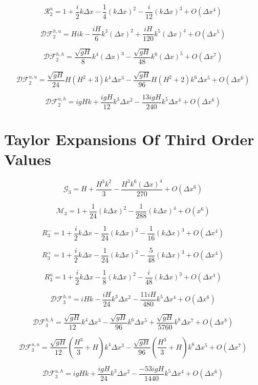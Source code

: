 \documentclass[12pt]{article}
\begin{document}
\[\mathcal{R}^u_2 = 1 + \frac{i}{2}k\Delta x - \frac{1}{4} (k \Delta x)^2 - \frac{i}{12} (k \Delta x)^3 +  O( \Delta x^4)\]

\[\mathcal{D}\mathcal{F}_2^{h,u} = Hik - \frac{iH}{6}k^3(\Delta x)^2 + \frac{iH}{120}k^5 (\Delta x)^4 + O(\Delta x ^5) \]

\[\mathcal{D}\mathcal{F}_2^{h,h} = \frac{\sqrt{gH}}{8} k^4(\Delta x)^3  - \frac{\sqrt{gH}}{48} k^6(\Delta x)^5 + O(\Delta x^7) \]

\[\mathcal{D}\mathcal{F}_2^{u,u} =  \frac{\sqrt{gH}}{24}H(H^2 +3)k^4 \Delta x^3 - \frac{\sqrt{gH}}{96}H(H^2 +2)k^6 \Delta x^5 + O(\Delta x ^6)\]

\[\mathcal{D}\mathcal{F}_2^{u,h} = igHk + \frac{igH}{12}  k^3 \Delta x^2 - \frac{13igH}{240}  k^5 \Delta x^4 + O(\Delta x ^6)  \]

\section{Taylor Expansions Of Third Order Values }

\[\mathcal{G}_3 = H + \frac{H^3k^2}{3} -\frac{H^3 k^6 (\Delta x)^4}{270} + O(\Delta x^{6}) \]

\[\mathcal{M}_3= 1 + \frac{1}{24} (k\Delta x)^2 - \frac{1}{288} (k\Delta x)^4 + O(x^{6})\]

\[R_3^-= 1 + \frac{i}{2}k\Delta x - \frac{1}{24} (k \Delta x)^2 - \frac{1}{16} (k \Delta x)^3 +  O( \Delta x^4) \]

\[R_3^+= 1 + \frac{i}{2}k\Delta x - \frac{1}{24} (k \Delta x)^2 - \frac{5}{48} (k \Delta x)^3 +  O( \Delta x^4)\] 

\[R^u_3 = 1 + \frac{i}{2}k\Delta x - \frac{1}{8} (k \Delta x)^2 - \frac{i}{48} (k \Delta x)^3 +  O( \Delta x^4) \]

\[\mathcal{D}\mathcal{F}_3^{h,u} = iHk - \frac{iH}{24} k^3 \Delta x ^2 - \frac{11iH}{480 }k^5 \Delta x ^4 + O(\Delta x ^6) \]

\[\mathcal{D}\mathcal{F}_3^{h,h} = \frac{\sqrt{gH}}{12} k^4 \Delta x^3 - \frac{\sqrt{gH}}{96}k^6 \Delta x^5 + \frac{\sqrt{gH}}{5760}k^8 \Delta x^7 + O(\Delta x ^8)\]

\[\mathcal{D}\mathcal{F}_3^{u,u} = \frac{\sqrt{gH}}{12}(\frac{H^3}{3} + H) k^4 \Delta x^3 - \frac{\sqrt{gH}}{96}(\frac{H^3}{3} + H)k^6 \Delta x^5  + O(\Delta x ^7)\]

\[\mathcal{D}\mathcal{F}_3^{u,h} = igH k + \frac{igH}{24} k^3 \Delta x^2 - \frac{-53 igH }{1440} k^5\Delta x^4 + O(\Delta x ^6) \]
\end{document}
